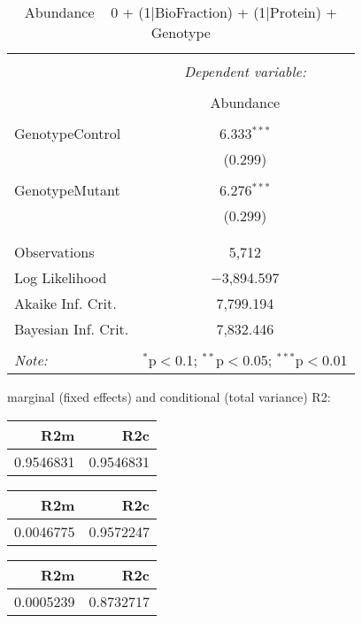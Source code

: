 \documentclass[11pt]{report}
\begin{document}
\begin{table}[!htbp] \centering 
  \caption{Abundance ~ 0 + (1|BioFraction) + (1|Protein) + Genotype} 
  \label{} 
\begin{tabular}{@{\extracolsep{5pt}}lc} 
\\[-1.8ex]\hline 
\hline \\[-1.8ex] 
 & \multicolumn{1}{c}{\textit{Dependent variable:}} \\ 
\cline{2-2} 
\\[-1.8ex] & Abundance \\ 
\hline \\[-1.8ex] 
 GenotypeControl & 6.333$^{***}$ \\ 
  & (0.299) \\ 
  & \\ 
 GenotypeMutant & 6.276$^{***}$ \\ 
  & (0.299) \\ 
  & \\ 
\hline \\[-1.8ex] 
Observations & 5,712 \\ 
Log Likelihood & $-$3,894.597 \\ 
Akaike Inf. Crit. & 7,799.194 \\ 
Bayesian Inf. Crit. & 7,832.446 \\ 
\hline 
\hline \\[-1.8ex] 
\textit{Note:}  & \multicolumn{1}{r}{$^{*}$p$<$0.1; $^{**}$p$<$0.05; $^{***}$p$<$0.01} \\ 
\end{tabular} 
\end{table} 
marginal (fixed effects) and conditional (total variance) R2:

\begin{tabular}{r|r}
\hline
R2m & R2c\\
\hline
0.9546831 & 0.9546831\\
\hline
\end{tabular}

\begin{tabular}{r|r}
\hline
R2m & R2c\\
\hline
0.0046775 & 0.9572247\\
\hline
\end{tabular}

\begin{tabular}{r|r}
\hline
R2m & R2c\\
\hline
0.0005239 & 0.8732717\\
\hline
\end{tabular}
\end{document}

